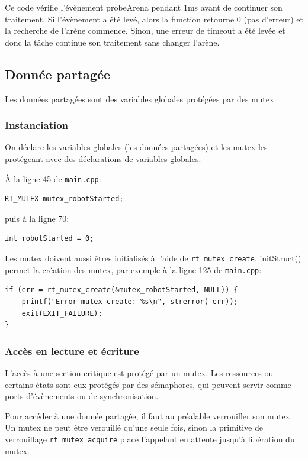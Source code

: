 \documentclass[11pt, a4paper]{paper}
\begin{document}
Ce code vérifie l'évènement probeArena pendant 1ms avant de continuer son traitement. Si l'évènement a été levé, alors la function retourne 0 (pas d'erreur) et la recherche de l'arène commence. Sinon, une erreur de timeout a été levée et donc la tâche continue son traitement sans changer l'arène.

\subsection{Donnée partagée}
Les données partagées sont des variables globales protégées par des mutex.

\subsubsection{Instanciation}

On déclare les variables globales (les données partagées) et les mutex les protégeant avec des déclarations de variables globales.

À la ligne 45 de {\tt main.cpp}:
\begin{verbatim}
RT_MUTEX mutex_robotStarted;
\end{verbatim}

puis à la ligne 70:
\begin{verbatim}
int robotStarted = 0;
\end{verbatim}

Les mutex doivent aussi êtres initialisés à l'aide de {\tt rt\_mutex\_create}. initStruct() permet la création des mutex, par exemple à la ligne 125 de {\tt main.cpp}:

\begin{verbatim}
if (err = rt_mutex_create(&mutex_robotStarted, NULL)) {
    printf("Error mutex create: %s\n", strerror(-err));
    exit(EXIT_FAILURE);
}
\end{verbatim}

\subsubsection{Accès en lecture et écriture}
L'accès à une section critique est protégé par un mutex. Les ressources ou certains états sont eux protégés par des sémaphores, qui peuvent servir comme ports d'évènements ou de synchronisation.

Pour accéder à une donnée partagée, il faut au préalable verrouiller son mutex. Un mutex ne peut être verouillé qu'une seule fois, sinon la primitive de verrouillage {\tt rt\_mutex\_acquire} place l'appelant en attente jusqu'à libération du mutex.
\end{document}
